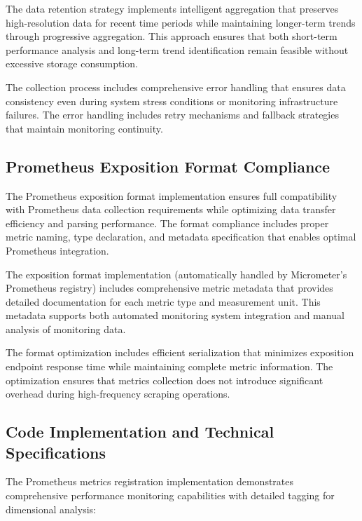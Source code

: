 The data retention strategy implements intelligent aggregation that preserves high-resolution data for recent time periods while maintaining longer-term trends through progressive aggregation. This approach ensures that both short-term performance analysis and long-term trend identification remain feasible without excessive storage consumption.

The collection process includes comprehensive error handling that ensures data consistency even during system stress conditions or monitoring infrastructure failures. The error handling includes retry mechanisms and fallback strategies that maintain monitoring continuity.

\subsection{Prometheus Exposition Format Compliance}

The Prometheus exposition format implementation ensures full compatibility with Prometheus data collection requirements while optimizing data transfer efficiency and parsing performance. The format compliance includes proper metric naming, type declaration, and metadata specification that enables optimal Prometheus integration.

The exposition format implementation (automatically handled by Micrometer's Prometheus registry) includes comprehensive metric metadata that provides detailed documentation for each metric type and measurement unit. This metadata supports both automated monitoring system integration and manual analysis of monitoring data.

The format optimization includes efficient serialization that minimizes exposition endpoint response time while maintaining complete metric information. The optimization ensures that metrics collection does not introduce significant overhead during high-frequency scraping operations.

\subsection{Code Implementation and Technical Specifications}

The Prometheus metrics registration implementation demonstrates comprehensive performance monitoring capabilities with detailed tagging for dimensional analysis:

